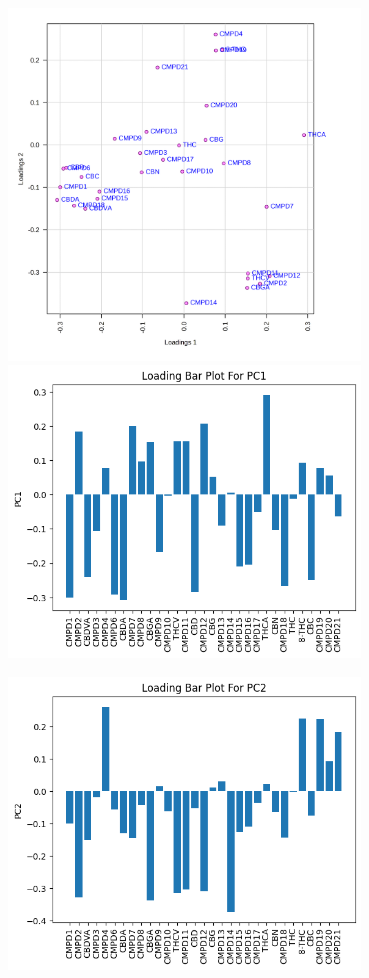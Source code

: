 \documentclass{article}
\begin{document}
\includegraphics[width=0.7\textwidth]{pca_loading_0_dpi300.png}
\includegraphics[width=0.7\textwidth]{PC1.png}

\includegraphics[width=0.7\textwidth]{PC2.png}
\end{document}
